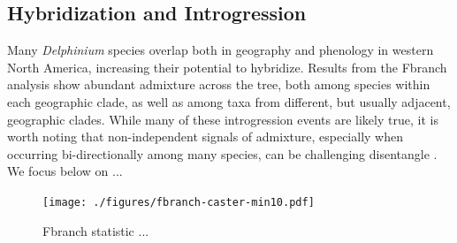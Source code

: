 \documentclass[11pt]{article}
\begin{document}



\subsection{Hybridization and Introgression}
Many \emph{Delphinium} species overlap both in geography and phenology in western 
North America, increasing their potential to hybridize. Results from the Fbranch
analysis show abundant admixture across the tree, both among species within each 
geographic clade, as well as among taxa from different, but usually adjacent,
geographic clades.
While many of these introgression events are likely true, it is worth noting
that non-independent signals of admixture, especially when occurring bi-directionally
among many species, can be challenging disentangle \citep{eaton_historical_2015}.
% 
We focus below on ...


\begin{figure}[t!]
	\centering
	\texttt{[image: ./figures/fbranch-caster-min10.pdf]}
	\caption{
        Fbranch statistic ...
	}
	\label{fig:fbranch}
\end{figure}
\end{document}
